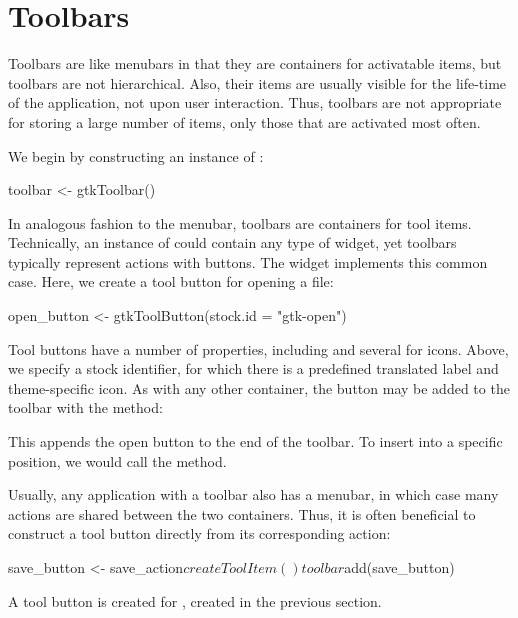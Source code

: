 \section{Toolbars}
\label{sec:RGtk2:toolbars}

Toolbars are like menubars in that they are containers for
activatable items, but toolbars are not hierarchical. Also, their
items are usually visible for the life-time of the application, not
upon user interaction. Thus, toolbars are not appropriate for storing a
large number of items, only those that are activated most often.

We begin by constructing an instance of :
\begin{Schunk}
\begin{Sinput}
 toolbar <- gtkToolbar()
\end{Sinput}
\end{Schunk}

In analogous fashion to the menubar, toolbars are containers for tool
items. Technically, an instance of  could contain
any type of widget, yet toolbars typically represent actions
with buttons. The  widget implements this common
case.  Here, we create a tool button for opening a file:
\begin{Schunk}
\begin{Sinput}
 open_button <- gtkToolButton(stock.id = "gtk-open") 
\end{Sinput}
\end{Schunk}
%
Tool buttons have a number of properties, including  and
several for icons. Above, we specify a stock identifier,
for which there is a predefined translated label and theme-specific icon.
As with any other container, the button may be added to the toolbar with
the  method:
\begin{Schunk}
\end{Schunk}
%
This appends the open button to the end of the toolbar. To insert into
a specific position, we would call the  method.

Usually, any application with a toolbar also has a menubar, in which
case many actions are shared between the two containers. Thus, it is
often beneficial to construct a tool button directly from its
corresponding action:
\begin{Schunk}
\begin{Sinput}
 save_button <- save_action$createToolItem()
 toolbar$add(save_button)
\end{Sinput}
\end{Schunk}
%
A tool button is created for , created in the
previous section.

